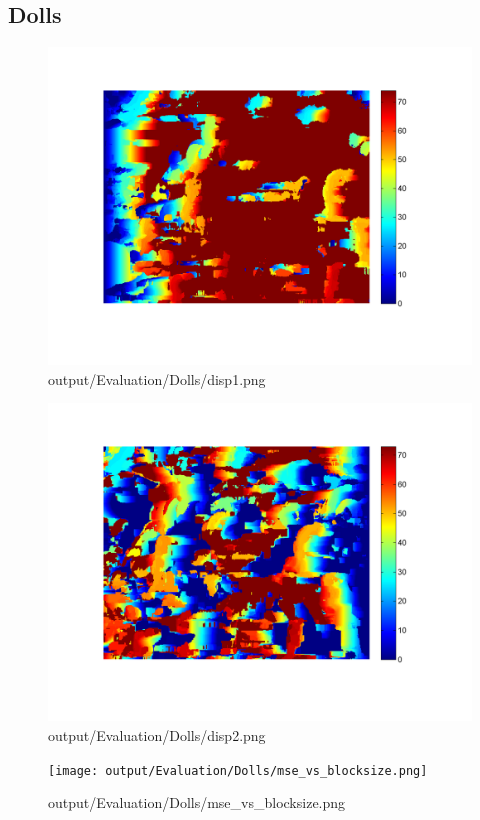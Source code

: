 \subsection{Dolls}
\begin{figure}[h]    \includegraphics[scale=0.5]{output/Evaluation/Dolls/disp1.png}    \caption{output/Evaluation/Dolls/disp1.png}\end{figure}
\begin{figure}[h]    \includegraphics[scale=0.5]{output/Evaluation/Dolls/disp2.png}    \caption{output/Evaluation/Dolls/disp2.png}\end{figure}
\begin{figure}[h]    \texttt{[image: output/Evaluation/Dolls/mse\_vs\_blocksize.png]}    \caption{output/Evaluation/Dolls/mse\_vs\_blocksize.png}\end{figure}
